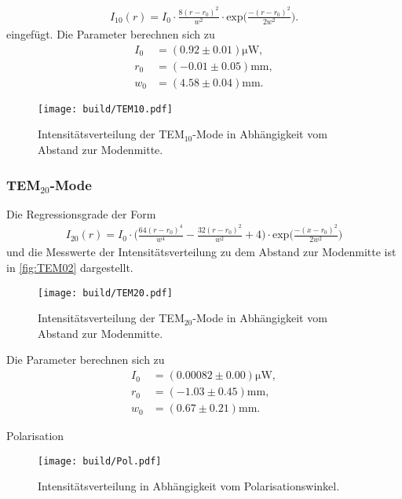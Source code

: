 \begin{align*}
  I_{10}(r) = I_0 \cdot \frac{8(r-r_0)^2}{w^2} \cdot \text{exp}\Biggl(\frac{-(r-r_0)^2}{2 w^2}\Biggr).
\end{align*}
eingefügt. Die Parameter berechnen sich zu
\begin{align*}
  I_{0} &= (0.92 \pm 0.01) \si{\micro\W},\\
  r_0 &= (-0.01 \pm 0.05) \si{\milli\meter},\\
  w_0 &= (4.58 \pm 0.04) \si{\milli\meter}.
\end{align*}

\begin{figure}[H]
  \centering
  \texttt{[image: build/TEM10.pdf]}
  \caption {Intensitätsverteilung der TEM$_{10}$-Mode in Abhängigkeit vom Abstand zur Modenmitte.}
  \label{fig:TEM10}
\end{figure}

\subsubsection{TEM$_{20}$-Mode}
\label{subsubsec:20Mode}
Die Regressionsgrade der Form
\begin{align*}
  I_{20}(r) = I_0 \cdot \Biggl(\frac{64(r-r_0)^4}{w^4}-\frac{32(r-r_0)^2}{w^2}+4\Biggr) \cdot \text{exp}\Biggl(\frac{-(x-r_0)^2}{2 w^2}\Biggr)
\end{align*}
und die Messwerte der Intensitätsverteilung zu dem Abstand zur Modenmitte ist in \autoref{fig:TEM02} dargestellt.
\begin{figure}[H]
  \centering
  \texttt{[image: build/TEM20.pdf]}
  \caption {Intensitätsverteilung der TEM$_{20}$-Mode in Abhängigkeit vom Abstand zur Modenmitte.}
  \label{fig:TEM20}
\end{figure}

Die Parameter berechnen sich zu
\begin{align*}
  I_{0} &= (0.00082 \pm 0.00) \si{\micro\W},\\
  r_0 &= (-1.03 \pm 0.45) \si{\milli\meter},\\
  w_0 &= (0.67 \pm 0.21) \si{\milli\meter}.
\end{align*}

Polarisation

\begin{figure}[H]
  \centering
  \texttt{[image: build/Pol.pdf]}
  \caption {Intensitätsverteilung in Abhängigkeit vom Polarisationswinkel.}
  \label{fig:Pol}
\end{figure}







